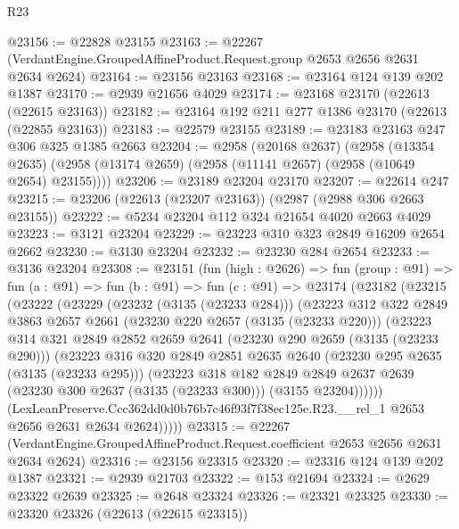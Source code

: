 \begin{lexlean}{R23}
\begin{coremodule}
@23156 := @22828 @23155
@23163 := @22267 (VerdantEngine.GroupedAffineProduct.Request.group @2653 @2656 @2631 @2634 @2624)
@23164 := @23156 @23163
@23168 := @23164 @124 @139 @202 @1387
@23170 := @2939 @21656 @4029
@23174 := @23168 @23170 (@22613 (@22615 @23163))
@23182 := @23164 @192 @211 @277 @1386 @23170 (@22613 (@22855 @23163))
@23183 := @22579 @23155
@23189 := @23183 @23163 @247 @306 @325 @1385 @2663
@23204 := @2958
    (@20168 @2637)
    (@2958
      (@13354 @2635)
      (@2958 (@13174 @2659) (@2958 (@11141 @2657) (@2958 (@10649 @2654) @23155))))
@23206 := @23189 @23204 @23170
@23207 := @22614 @247
@23215 := @23206 (@22613 (@23207 @23163)) (@2987 (@2988 @306 @2663 @23155))
@23222 := @5234 @23204 @112 @324 @21654 @4020 @2663 @4029
@23223 := @3121 @23204
@23229 := @23223 @310 @323 @2849 @16209 @2654 @2662
@23230 := @3130 @23204
@23232 := @23230 @284 @2654
@23233 := @3136 @23204
@23308 := @23151
    (fun (high : @2626) =>
    fun (group : @91) =>
    fun (a : @91) =>
    fun (b : @91) =>
    fun (c : @91) =>
    @23174
      (@23182
        (@23215
          (@23222
            (@23229
              (@23232 (@3135 (@23233 @284)))
              (@23223
                @312
                @322
                @2849
                @3863
                @2657
                @2661
                (@23230 @220 @2657 (@3135 (@23233 @220)))
                (@23223
                  @314
                  @321
                  @2849
                  @2852
                  @2659
                  @2641
                  (@23230 @290 @2659 (@3135 (@23233 @290)))
                  (@23223
                    @316
                    @320
                    @2849
                    @2851
                    @2635
                    @2640
                    (@23230 @295 @2635 (@3135 (@23233 @295)))
                    (@23223
                      @318
                      @182
                      @2849
                      @2849
                      @2637
                      @2639
                      (@23230 @300 @2637 (@3135 (@23233 @300)))
                      (@3155 @23204))))))
            (LexLeanPreserve.Ccc362dd0d0b76b7c46f93f7f38ec125e.R23.__rel_1
              @2653
              @2656
              @2631
              @2634
              @2624)))))
@23315 := @22267
    (VerdantEngine.GroupedAffineProduct.Request.coefficient @2653 @2656 @2631 @2634 @2624)
@23316 := @23156 @23315
@23320 := @23316 @124 @139 @202 @1387
@23321 := @2939 @21703
@23322 := @153 @21694
@23324 := @2629 @23322 @2639
@23325 := @2648 @23324
@23326 := @23321 @23325
@23330 := @23320 @23326 (@22613 (@22615 @23315))

\end{coremodule}
\end{lexlean}
